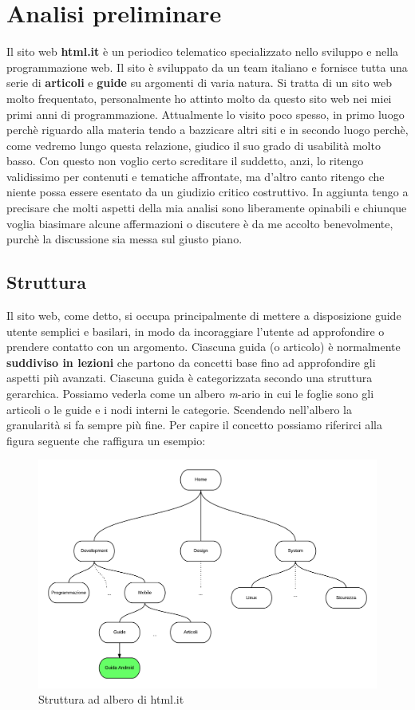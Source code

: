 \section{Analisi preliminare}

Il sito web \textbf{html.it} è un periodico telematico specializzato nello sviluppo e nella programmazione web. Il sito è sviluppato da un team italiano e fornisce tutta una serie di \textbf{articoli} e \textbf{guide} su argomenti di varia natura. Si tratta di un sito web molto frequentato, personalmente ho attinto molto da questo sito web nei miei primi anni di programmazione. Attualmente lo visito poco spesso, in primo luogo perchè riguardo alla materia tendo a bazzicare altri siti e in secondo luogo perchè, come vedremo lungo questa relazione, giudico il suo grado di usabilità molto basso. Con questo non voglio certo screditare il suddetto, anzi, lo ritengo validissimo per contenuti e tematiche affrontate, ma d'altro canto ritengo che niente possa essere esentato da un giudizio critico costruttivo. In aggiunta tengo a precisare che molti aspetti della mia analisi sono liberamente opinabili e chiunque voglia biasimare alcune affermazioni o discutere è da me accolto benevolmente, purchè la discussione sia messa sul giusto piano.

\subsection{Struttura}

Il sito web, come detto, si occupa principalmente di mettere a disposizione guide utente semplici e basilari, in modo da incoraggiare l'utente ad approfondire o prendere contatto con un argomento. Ciascuna guida (o articolo) è normalmente \textbf{suddiviso in lezioni} che partono da concetti base fino ad approfondire gli aspetti più avanzati. Ciascuna guida è categorizzata secondo una struttura gerarchica. Possiamo vederla come un albero \textit{m}-ario in cui le foglie sono gli articoli o le guide e i nodi interni le categorie. Scendendo nell'albero la granularità si fa sempre più fine. Per capire il concetto possiamo riferirci alla figura seguente che raffigura un esempio:

\begin{figure}[htpd]
\centering
\includegraphics[width=120mm]{images/tree.png}
\caption{Struttura ad albero di html.it}
\end{figure}


